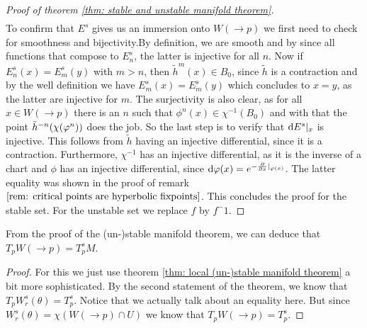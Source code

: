 \begin{proof}[Proof of theorem \ref{thm: stable and unstable manifold theorem}]
\begin{align*}
	\end{align*} To confirm that $E^s$ gives us an immersion onto $W(\to p)$ we first need to check for smoothness and bijectivity.By definition, we are smooth and by since all functions that compose to $E^s_n$, the latter is injective for all $n$. Now if $E^s_n(x)=E^s_m(y)$ with $m>n$, then $\tilde{h}^m(x)\in B_0$, since $\tilde{h}$ is a contraction and by the well definition we have $E^s_m(x)=E^s_m(y)$ which concludes to $x=y$, as the latter are injective for $m$. The surjectivity is also clear, as for all $x\in W(\to p)$ there is an $n$ such that $\phi^n(x)\in \chi^{-1}(B_0)$ and with that the point $\Tilde{h}^{-n}(\chi(\phi^n))$ does the job. So the last step is to verify that $\diff E^s|_x$ is injective. This follows from $\tilde{h}$ having an injective differential, since it is a contraction. Furthermore, $\chi^{-1}$ has an injective differential, as it is the inverse of a chart and $\phi$ has an injective differential, since $\diff \phi (x)=e^{-\frac{\partial}{\partial x}|_{\phi(x)}}$. The latter equality was shown in the proof of remark $\ref{rem: critical points are hyperbolic fixpoints}$. This concludes the proof for the stable set. For the unstable set we replace $f$ by $f^-1$. 
\end{proof}
\begin{cor}
	From the proof of the (un-)stable manifold theorem, we can deduce that $T_pW(\to p)=T^s_pM$.
\end{cor}
\begin{proof}
	For this we just use theorem \ref{thm: local (un-)stable manifold theorem} a bit more sophisticated. By the second statement of the theorem, we know that $T_pW^s_r(\theta)=T^s_p$. Notice that we actually talk about an equality here. But since $W^s_r(\theta)=\chi(W(\to p) \cap U)$ we know that $T_pW(\to p)=T^s_p$. 
\end{proof}

